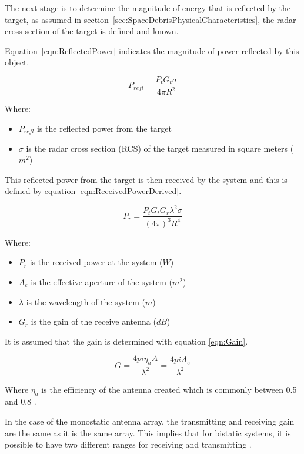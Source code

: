 \documentclass[11pt]{witseiepaper}
\begin{document}
\begin{bibunit}[witseie]
The next stage is to determine the magnitude of energy that is reflected by the target, as assumed in section~\ref{sec:SpaceDebrisPhysicalCharacteristics}, the radar cross section of the target is defined and known. 

Equation~\ref{eqn:ReflectedPower} indicates the magnitude of power reflected by this object.

\begin{equation} \label{eqn:ReflectedPower}
P_{refl} = \frac{P_{t} G_{t} \sigma}{4 \pi R^2}
\end{equation}

Where:
\begin{itemize}
    \item $P_{refl}$ is the reflected power from the target
    \item $\sigma$ is the radar cross section (RCS) of the target measured in square meters ($m^2$)
\end{itemize}

This reflected power from the target is then received by the system and this is defined by equation \ref{eqn:ReceivedPowerDerived}.

\begin{equation} \label{eqn:ReceivedPowerDerived}
P_{r} = \frac{P_{t} G_{t} G_{r} \lambda^2 \sigma}{(4 \pi )^3 R^4}
\end{equation}

Where:
\begin{itemize}
    \item $P_{r}$ is the received power at the system ($W$)
    \item $A_{e}$ is the effective aperture of the system ($m^2$)
    \item $\lambda$ is the wavelength of the system ($m$)
    \item $G_{r}$ is the gain of the receive antenna ($dB$)
\end{itemize}

It is assumed that the gain is determined with equation \ref{eqn:Gain}.

\begin{equation} \label{eqn:Gain}
G = \frac{4 pi \eta_{a} A}{\lambda^2} = \frac{4 pi A_{e}}{\lambda^2}
\end{equation}

Where $\eta_{a}$ is the efficiency of the antenna created which is commonly between 0.5 and 0.8 \cite[p.~64]{radarHandbook}.

In the case of the monostatic antenna array, the transmitting and receiving gain are the same as it is the same array. This implies that for bistatic systems, it is possible to have two different ranges for receiving and transmitting \cite[p.~64]{radarHandbook}.



\end{bibunit}
\end{document}
